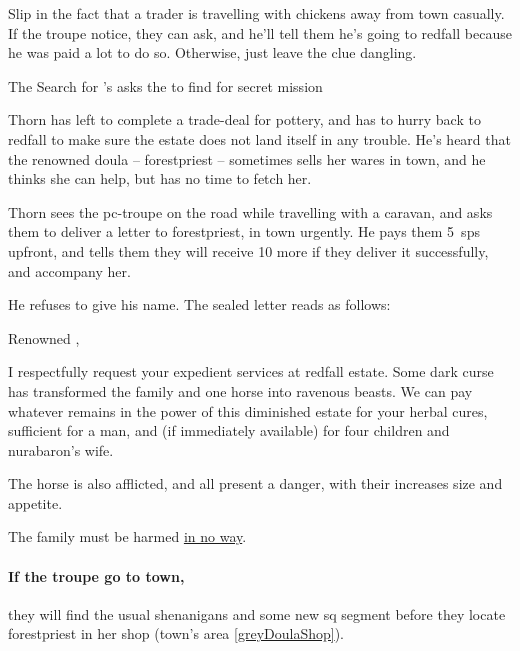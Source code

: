 Slip in the fact that a trader is travelling with chickens away from \gls{town} casually.
If the troupe notice, they can ask, and he'll tell them he's going to \gls{redfall} because he was paid a lot to do so.
Otherwise, just leave the clue dangling.

{The Search for }%
{'s  asks the  to find  for secret mission}%
\label{nonstarter}

\begin{exampletext}
  Thorn has left to complete a trade-deal for pottery, and has to hurry back to \gls{redfall} to make sure the estate does not land itself in any trouble.
  He's heard that the renowned \gls{doula} -- \gls{forestpriest} -- sometimes sells her wares in \gls{town}, and he thinks she can help, but has no time to fetch her.
\end{exampletext}

Thorn sees the \gls{pc}-troupe on the road while travelling with a caravan, and asks them to deliver a letter to \gls{forestpriest}, in \gls{town} urgently.
He pays them 5~\glspl{sp} upfront, and tells them they will receive 10 more if they deliver it successfully, and accompany her.

He refuses to give his name.
The sealed letter reads as follows:

\null
\begin{speechtext}
  Renowned ,

  I respectfully request your expedient services at \gls{redfall} estate.
  Some dark curse has transformed the family and one horse into ravenous beasts.
  We can pay whatever remains in the power of this diminished estate for your herbal cures, sufficient for a man, and (if immediately available) for four children and \gls{nurabaron}'s wife.

  The horse is also afflicted, and all present a danger, with their increases size and appetite.

  The family must be harmed \underline{in no way}.
\end{speechtext}

\thornSeneschal

\label{thorn}

\paragraph{If the troupe go to \gls{town},}
they will find the usual shenanigans and some new \gls{sq} \gls{segment} before they locate \gls{forestpriest} in her shop (\gls{town}'s area \vref{greyDoulaShop}).

